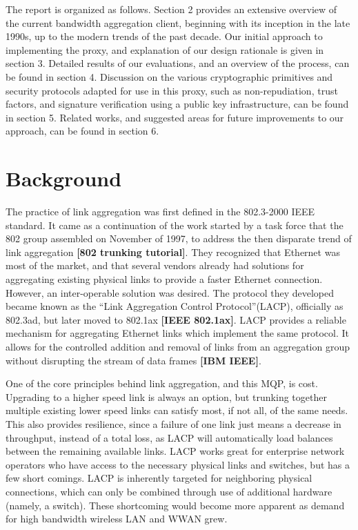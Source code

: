 \documentclass[12pt]{article}
\newcommand{\lcite}[1]
{{\bfseries\color{orange}[#1]}}
\begin{document}
	The report is organized as follows. Section 2 provides an extensive overview of the current bandwidth aggregation client, beginning with its inception in the late 1990s, up to the modern trends of the past decade. Our initial approach to implementing the proxy, and explanation of our design rationale is given in section 3. Detailed results of our evaluations, and an overview of the process, can be found in section 4. Discussion on the various cryptographic primitives and security protocols adapted for use in this proxy, such as non-repudiation, trust factors, and signature verification using a public key infrastructure, can be found in section 5. Related works, and suggested areas for future improvements to our approach, can be found in section 6.




\newpage
\section{Background}

	The practice of link aggregation was first defined in the 802.3-2000 IEEE standard. It came as a continuation of the work started by a task force that the 802 group assembled on November of 1997, to address the then disparate trend of link aggregation \lcite{802 trunking tutorial}. They recognized that Ethernet was most of the market, and that several vendors already had solutions for aggregating existing physical links to provide a faster Ethernet connection. However, an inter-operable solution was desired. The protocol they developed became known as the ``Link Aggregation Control Protocol''(LACP), officially as 802.3ad, but later moved to 802.1ax \lcite{IEEE 802.1ax}. LACP provides a reliable mechanism for aggregating Ethernet links which implement the same protocol. It allows for the controlled addition and removal of links from an aggregation group without disrupting the stream of data frames \lcite{IBM IEEE}.

	One of the core principles behind link aggregation, and this MQP, is cost. Upgrading to a higher speed link is always an option, but trunking together multiple existing lower speed links can satisfy most, if not all, of the same needs. This also provides resilience, since a failure of one link just means a decrease in throughput, instead of a total loss, as LACP will automatically load balances between the remaining available links. LACP works great for enterprise network operators who have access to the necessary physical links and switches, but has a few short comings. LACP is inherently targeted for neighboring physical connections, which can only be combined through use of additional hardware (namely, a switch). These shortcoming would become more apparent as demand for high bandwidth wireless LAN and WWAN grew.
\end{document}
